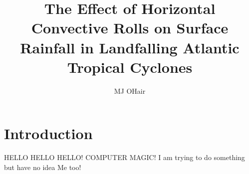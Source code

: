 \documentclass[12pt]{article}
\author{MJ OHair} \title{The Effect of Horizontal Convective Rolls on Surface Rainfall in Landfalling Atlantic Tropical Cyclones}
\begin{document}
\maketitle


\section{Introduction}
HELLO HELLO HELLO! COMPUTER MAGIC!
I am trying to do something but have no idea
Me too!
\end{document}
